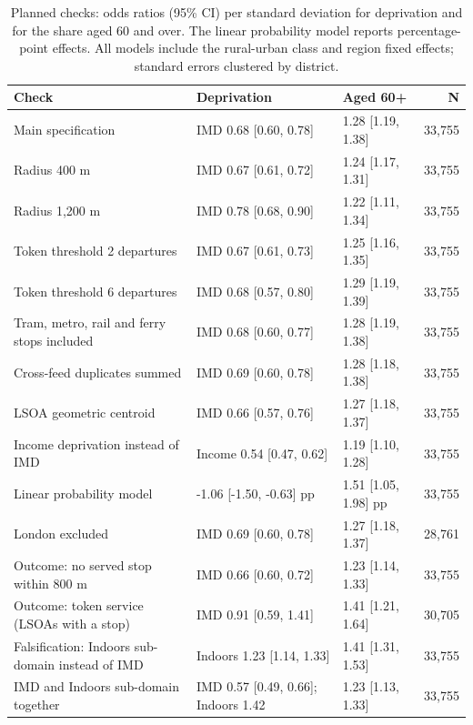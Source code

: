 \documentclass[11pt,a4paper]{article}
\begin{document}
\begin{table}[tbp]\centering\footnotesize\caption{Planned checks: odds ratios (95\% CI) per standard deviation for deprivation and for the share aged 60 and over. The linear probability model reports percentage-point effects. All models include the rural-urban class and region fixed effects; standard errors clustered by district.}\label{tab:robust}\begin{tabular}{p{5.4cm}p{5.1cm}lr}\toprule Check & Deprivation & Aged 60+ & N\\\midrule
Main specification & IMD 0.68 [0.60, 0.78] & 1.28 [1.19, 1.38] & 33,755\\
Radius 400 m & IMD 0.67 [0.61, 0.72] & 1.24 [1.17, 1.31] & 33,755\\
Radius 1,200 m & IMD 0.78 [0.68, 0.90] & 1.22 [1.11, 1.34] & 33,755\\
Token threshold 2 departures & IMD 0.67 [0.61, 0.73] & 1.25 [1.16, 1.35] & 33,755\\
Token threshold 6 departures & IMD 0.68 [0.57, 0.80] & 1.29 [1.19, 1.39] & 33,755\\
Tram, metro, rail and ferry stops included & IMD 0.68 [0.60, 0.77] & 1.28 [1.19, 1.38] & 33,755\\
Cross-feed duplicates summed & IMD 0.69 [0.60, 0.78] & 1.28 [1.18, 1.38] & 33,755\\
LSOA geometric centroid & IMD 0.66 [0.57, 0.76] & 1.27 [1.18, 1.37] & 33,755\\
Income deprivation instead of IMD & Income 0.54 [0.47, 0.62] & 1.19 [1.10, 1.28] & 33,755\\
Linear probability model & -1.06 [-1.50, -0.63] pp & 1.51 [1.05, 1.98] pp & 33,755\\
London excluded & IMD 0.69 [0.60, 0.78] & 1.27 [1.18, 1.37] & 28,761\\
Outcome: no served stop within 800 m & IMD 0.66 [0.60, 0.72] & 1.23 [1.14, 1.33] & 33,755\\
Outcome: token service (LSOAs with a stop) & IMD 0.91 [0.59, 1.41] & 1.41 [1.21, 1.64] & 30,705\\
Falsification: Indoors sub-domain instead of IMD & Indoors 1.23 [1.14, 1.33] & 1.41 [1.31, 1.53] & 33,755\\
IMD and Indoors sub-domain together & IMD 0.57 [0.49, 0.66]; Indoors 1.42 & 1.23 [1.13, 1.33] & 33,755\\
\bottomrule\end{tabular}\end{table}
\end{document}
